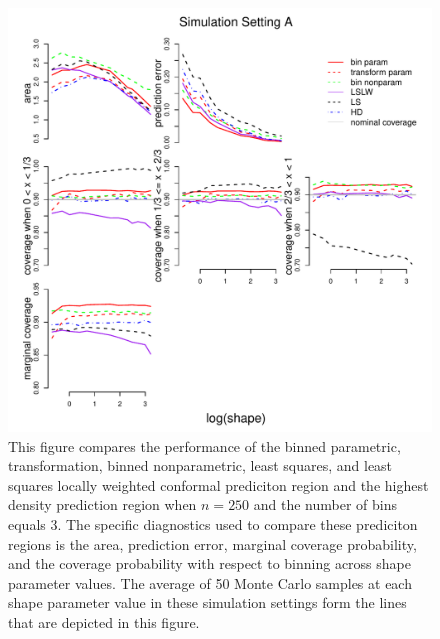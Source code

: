 \documentclass[11pt]{article}\usepackage[]{graphicx}\usepackage[]{color}
\makeatletter
\def\maxwidth{ %
  \ifdim\Gin@nat@width>\linewidth
    \linewidth
  \else
    \Gin@nat@width
  \fi
}
\newenvironment{knitrout}{}{} %
\makeatother
\begin{document}
\newpage
\begin{figure}[h!]
\begin{center}
\begin{knitrout}
\color{fgcolor}
\includegraphics[width=\maxwidth]{figure/Fig-gamma-250-1} 

\end{knitrout}
\end{center}
\caption{This figure compares the performance of the 
  binned parametric,
  transformation,
  binned nonparametric,
  least squares, and 
  least squares locally weighted conformal prediciton region and the 
  highest density prediction region when $n = 250$ and the number of bins 
  equals 3.  
  The specific diagnostics used to compare these prediciton regions is the 
    area,
    prediction error, 
    marginal coverage probability,
    and the coverage probability with respect to binning 
    across shape parameter values.
  The average of 50 Monte Carlo samples at each shape parameter value in 
  these simulation settings form the lines that are depicted in this figure.}
\label{Fig:gamma.250}
\end{figure}
\end{document}
